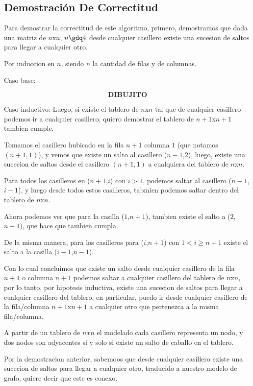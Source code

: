 \newpage
\subsection{Demostraci\'on De Correctitud}

Para demostrar la correctitud de este algoritmo, primero, demostramos que dada una matriz de $n$x$n$, $n\gdq 4$ desde cualquier casillero existe una sucesion de saltos para llegar a cualquier otro. 

Por induccion en $n$, siendo $n$ la cantidad de filas y de columnas.

Caso base:

$$\textbf{DIBUJITO}$$



Caso inductivo:
Luego, si existe el tablero de $n$x$n$ tal que de cualquier casillero podemos ir a cualquier casillero, quiero demostrar el tablero de $n+1$x$n+1$ tambien cumple.

Tomamos el casillero hubicado en la fila $n+1$ columna $1$ (que notamos $(n+1,1)$), y vemos que existe un salto al casillero ($n-1$,$2$), luego, existe una sucecion de saltos desde el casillero $(n+1,1)$ a cualquiera del tablero de $n$x$n$.

Para todos los casilleros en ($n+1$,$i$) con $i>1$, podemos saltar al casillero ($n-1$,$i-1$), y luego desde todos estos casilleros, tabmien podemos saltar dentro del tablero de $n$x$n$.

Ahora podemos ver que para la casilla ($1$,$n+1$), tambien existe el salto a ($2$,$n-1$), que hace que tambien cumpla.

De la misma manera, para los casilleros para ($i$,$n+1$) con $1< i \geq n+1$ existe el salto a la casilla ($i-1$,$n-1$).

Con lo cual concluimos que existe un salto desde cualquier casillero de la fila $n+1$ o columna $n+1$ podemos saltar a cualquier casillero del tablero de $n$x$n$, por lo tanto, por hipotesis inductiva, existe una sucecion de saltos para llegar a cualquier casillero del tablero, en particular, puedo ir desde cualquier casillero de la fila/columna $n+1$x$n+1$ a cualquier otro que pertenezca a la misma fila/columna.

A partir de un tablero de $nxn$ el modelado cada casillero representa un nodo, y dos nodos son adyacentes si y solo si existe un salto de caballo en el tablero.

Por la demostracion anterior, sabemoos que desde cualquier casillero existe una sucecion de saltos para llegar a cualquier otro, traducido a nuestro modelo de grafo, quiere decir que este es conexo.

